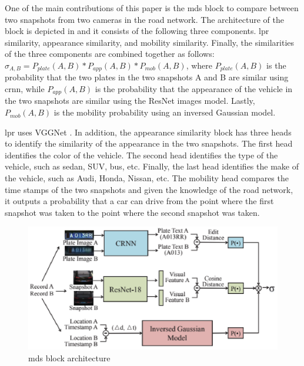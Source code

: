 One of the main contributions of this paper is the \ac{mds} block to compare between two snapshots from two cameras in the road network.
The architecture of the block is depicted in  and it consists of the following three components.
\ac{lpr} similarity, appearance similarity, and mobility similarity.
Finally, the similarities of the three components are combined together as follows:
$\sigma_{A,B} = P_{plate}(A,B) * P_{app}(A,B) * P_{mob}(A,B)$, where $P_{plate}(A,B)$ is the probability that the two plates in the two snapshots A and B are similar using \ac{crnn}, while $P_{app}(A,B)$ is the probability that the appearance of the vehicle in the two snapshots are similar using the ResNet images model.
Lastly, $P_{mob}(A,B)$ is the mobility probability using an inversed Gaussian model.

\ac{lpr} uses VGGNet \cite{simonyan2014very}.
In addition, the appearance similarity block has three heads to identify the similarity of the appearance in the two snapshots.
The first head identifies the color of the vehicle.
The second head identifies the type of the vehicle, such as sedan, SUV, bus, etc.
Finally, the last head identifies the make of the vehicle, such as Audi, Honda, Nissan, etc.
The mobility head compares the time stamps of the two snapshots and given the knowledge of the road network, it outputs a probability that a car can drive from the point where the first snapshot was taken to the point where the second snapshot was taken.


\begin{figure}
\centering
  \includegraphics[width=0.9\linewidth]{figures/MDS-block-architecture.eps}
  \caption{\ac{mds} block architecture \cite{tong2021large}}
  \label{fig:mds-architecture}
\end{figure}

